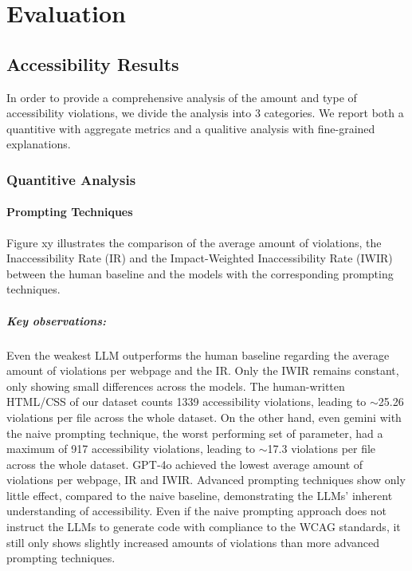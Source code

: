 \chapter{Evaluation}\label{chapter:Evaluation}


\section{Accessibility Results}
In order to provide a comprehensive analysis of the amount and type of accessibility violations, 
we divide the analysis into 3 categories. We report both a quantitive with aggregate 
metrics and a qualitive analysis with fine-grained explanations.

\subsection{Quantitive Analysis}
\subsubsection{Prompting Techniques}
Figure xy illustrates the comparison of the average amount of violations, the
Inaccessibility Rate (IR) and the Impact-Weighted Inaccessibility Rate (IWIR) between 
the human baseline and the models with the corresponding prompting techniques.

\paragraph{Key observations:}
Even the weakest LLM outperforms the human baseline regarding the average amount
of violations per webpage and the IR. Only the IWIR remains constant, only showing small 
differences across the models. The human-written HTML/CSS of our dataset counts 1339 accessibility 
violations, leading to $\sim$25.26 violations per file across the whole dataset.
On the other hand, even gemini with the naive prompting technique,
the worst performing set of parameter, had a maximum of 917 accessibility 
violations, leading to $\sim$17.3 violations per file across the whole dataset.\newline
GPT‑4o achieved the lowest average amount of violations per webpage, IR and IWIR.\newline
Advanced prompting techniques show only little effect, compared to the naive baseline, 
demonstrating the LLMs' inherent understanding of accessibility. 
Even if the naive prompting approach does not instruct the LLMs to generate
code with compliance to the WCAG standards, it still only shows slightly 
increased amounts of violations than more advanced prompting techniques.



